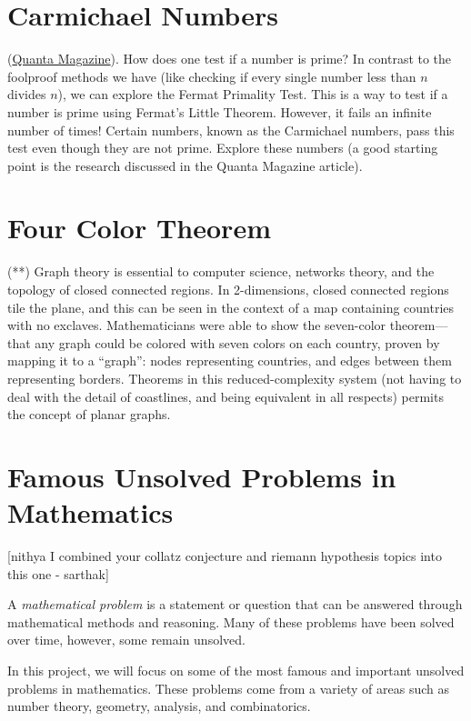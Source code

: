 \documentclass{article}
\begin{document}
\pagebreak

\section{ Carmichael Numbers} (\hyperlink{https://www.quantamagazine.org/teenager-solves-stubborn-riddle-about-prime-number-look-alikes-20221013/}{Quanta Magazine}). How does one test if a number is prime? In contrast to the foolproof methods we have (like checking if every single number less than $n$ divides $n$), we can explore the Fermat Primality Test. This is a way to test if a number is prime using Fermat's Little Theorem. However, it fails an infinite number of times! Certain numbers, known as the Carmichael numbers, pass this test even though they are not prime. Explore these numbers (a good starting point is the research discussed in the Quanta Magazine article).
        
\pagebreak

\section{Four Color Theorem} (**)
    Graph theory is essential to computer science, networks theory, and the topology of closed connected regions.
    In 2-dimensions, closed connected regions tile the plane, and this can be seen in the context of a map containing countries with no exclaves.
    Mathematicians were able to show the seven-color theorem---that any graph could be colored with seven colors on each country, proven by mapping it to a ``graph'': nodes representing countries, and edges between them representing borders.
    Theorems in this reduced-complexity system (not having to deal with the detail of coastlines, and being equivalent in all respects) permits the concept of planar graphs.

\pagebreak

\section{Famous Unsolved Problems in Mathematics}
    [nithya  I combined your collatz conjecture and riemann hypothesis topics into this one - sarthak]
    
    A \textit{mathematical problem} is a statement or question that can be answered through mathematical methods and reasoning. Many of these problems have been solved over time, however, some remain unsolved.
    
    
    \vspace{3mm}
    In this project, we will focus on some of the most famous and important unsolved problems in mathematics. These problems come from a variety of areas such as number theory, geometry, analysis, and combinatorics. 
    
\end{document}
